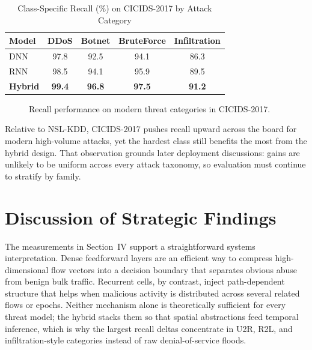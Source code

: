 \documentclass[10pt, conference, compsocconf, letterpaper, twocolumn, twoside]{IEEEtran}
\begin{document}
\begin{table}[h]
\centering
\caption{Class-Specific Recall (\%) on CICIDS-2017 by Attack Category}
\label{table:cic_class_recall}
\begin{tabular}{|l|c|c|c|c|}
\hline
\textbf{Model} & \textbf{DDoS} & \textbf{Botnet} & \textbf{BruteForce} & \textbf{Infiltration} \\ \hline
DNN & 97.8 & 92.5 & 94.1 & 86.3 \\
RNN & 98.5 & 94.1 & 95.9 & 89.5 \\
\textbf{Hybrid} & \textbf{99.4} & \textbf{96.8} & \textbf{97.5} & \textbf{91.2} \\ \hline
\end{tabular}
\end{table}

\begin{figure}[h]
\centering
{}
\caption{Recall performance on modern threat categories in CICIDS-2017.}
\end{figure}

Relative to NSL-KDD, CICIDS-2017 pushes recall upward across the board for modern high-volume attacks, yet the hardest class still benefits the most from the hybrid design. That observation grounds later deployment discussions: gains are unlikely to be uniform across every attack taxonomy, so evaluation must continue to stratify by family.

\section{Discussion of Strategic Findings}
The measurements in Section~IV support a straightforward systems interpretation. Dense feedforward layers are an efficient way to compress high-dimensional flow vectors into a decision boundary that separates obvious abuse from benign bulk traffic. Recurrent cells, by contrast, inject path-dependent structure that helps when malicious activity is distributed across several related flows or epochs. Neither mechanism alone is theoretically sufficient for every threat model; the hybrid stacks them so that spatial abstractions feed temporal inference, which is why the largest recall deltas concentrate in U2R, R2L, and infiltration-style categories instead of raw denial-of-service floods.
\end{document}
